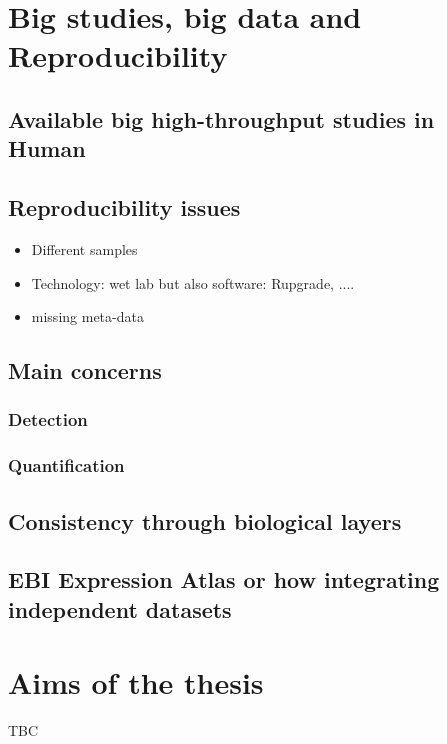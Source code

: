 \section{Big studies, big data and Reproducibility}
    \subsection{Available big high-throughput studies in Human}
    \subsection{Reproducibility issues}
        \begin{itemize}
            \item{Different samples}
            \item{Technology: wet lab but also software: Rupgrade, ....}
            \item{missing meta-data}
        \end{itemize}
    \subsection{Main concerns}
        \subsubsection{Detection}
        \subsubsection{Quantification}
    \subsection{Consistency through biological layers}
    \subsection{EBI Expression Atlas or how integrating independent
    datasets }

\section{Aims of the thesis}

TBC



